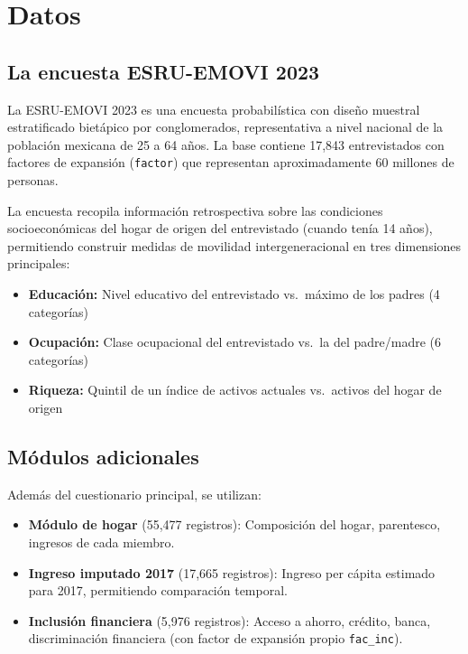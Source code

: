 \documentclass[12pt, a4paper]{article}
\begin{document}
\section{Datos}
\label{sec:data}

\subsection{La encuesta ESRU-EMOVI 2023}

La ESRU-EMOVI 2023 es una encuesta probabilística con diseño muestral estratificado bietápico por conglomerados, representativa a nivel nacional de la población mexicana de 25 a 64 años. La base contiene 17,843 entrevistados con factores de expansión (\texttt{factor}) que representan aproximadamente 60 millones de personas.

La encuesta recopila información retrospectiva sobre las condiciones socioeconómicas del hogar de origen del entrevistado (cuando tenía 14 años), permitiendo construir medidas de movilidad intergeneracional en tres dimensiones principales:

\begin{itemize}
    \item \textbf{Educación:} Nivel educativo del entrevistado vs.\ máximo de los padres (4 categorías)
    \item \textbf{Ocupación:} Clase ocupacional del entrevistado vs.\ la del padre/madre (6 categorías)
    \item \textbf{Riqueza:} Quintil de un índice de activos actuales vs.\ activos del hogar de origen
\end{itemize}

\subsection{Módulos adicionales}

Además del cuestionario principal, se utilizan:

\begin{itemize}
    \item \textbf{Módulo de hogar} (55,477 registros): Composición del hogar, parentesco, ingresos de cada miembro.
    \item \textbf{Ingreso imputado 2017} (17,665 registros): Ingreso per cápita estimado para 2017, permitiendo comparación temporal.
    \item \textbf{Inclusión financiera} (5,976 registros): Acceso a ahorro, crédito, banca, discriminación financiera (con factor de expansión propio \texttt{fac\_inc}).
\end{itemize}
\end{document}
